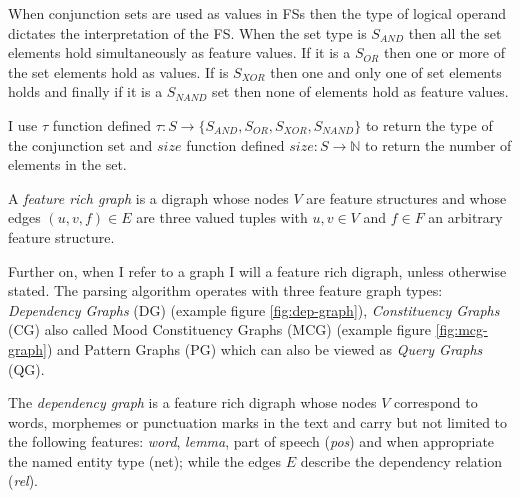 When conjunction sets are used as values in FSs then the type of logical operand dictates the interpretation of the FS. When the set type is $S_{AND}$ then all the set elements hold simultaneously as feature values. If it is a $S_{OR}$ then one or more of the set elements hold as values. If is $S_{XOR}$ then one and only one of set elements holds and finally if it is a $S_{NAND}$ set then none of elements hold as feature values.

I use $\tau$ function defined $\tau:S \rightarrow \{S_{AND},S_{OR},S_{XOR},S_{NAND} \}$ to return the type of the conjunction set and $size$ function defined $size:S \rightarrow \mathbb{N}$ to return the number of elements in the set.
 
\begin{definition}\label{def:feature-rich-graph}
	A \textit{feature rich graph} is a digraph whose nodes $V$ are feature structures and whose edges $(u,v,f) \in E$ are three valued tuples with $ u,v \in V$ and $f \in F$ an arbitrary feature structure.
\end{definition}

Further on, when I refer to a graph I will a feature rich digraph, unless otherwise stated. The parsing algorithm operates with three feature graph types: \textit{Dependency Graphs} (DG) (example figure \ref{fig:dep-graph}), \textit{Constituency Graphs} (CG) also called Mood Constituency Graphs (MCG) (example figure \ref{fig:mcg-graph}) and Pattern Graphs (PG) which can also be viewed as \textit{Query Graphs} (QG). 

\begin{definition}\label{def:dep-graph}
	The \textit{dependency graph} is a feature rich digraph whose nodes $V$ correspond to words, morphemes or punctuation marks in the text and carry but not limited to the following features: \textit{word}, \textit{lemma}, part of speech (\textit{pos}) and when appropriate the named entity type (net); while the edges $E$ describe the dependency relation (\textit{rel}).
\end{definition}

